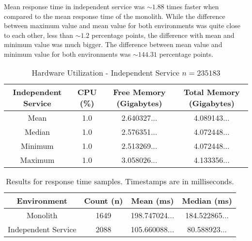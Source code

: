 Mean response time in independent service was $\sim1.88$ times faster when compared to the mean response time of the monolith.
While the difference between maximum value and mean value for both environments was quite close to each other, less than $\sim1.2$ percentage points, the difference with mean and minimum value was much bigger.
The difference between mean value and minimum value for both environments was $\sim144.31$ percentage points.

\begin{table}[h!]
       \begin{tabular}{|c|c|c|c|} 
        \hline
        Independent Service
        & CPU (\%)
        & Free Memory (Gigabytes)
        & Total Memory (Gigabytes) \\ [0.5ex] 
        
        \hline\hline
        Mean
        & 1.0
        & 2.640327...
        & 4.089143... \\ 
        
        Median
        & 1.0
        & 2.576351...
        & 4.072448... \\ 

        Minimum
        & 1.0
        & 2.513269...
        & 4.072448...\\ 
        
        Maximum
        & 1.0
        & 3.058026...
        & 4.133356... \\
        \hline
    \end{tabular}
    \caption{Hardware Utilization - Independent Service $n=235183$}
    \label{table:hardware results:independent service:1}
\end{table}

\begin{table}[h!]
    \begin{tabular}{|c|c|c|c|} 
        \hline
        Environment
        & Count (n)
        & Mean (ms)
        & Median (ms) \\ [0.5ex] 
        
        \hline\hline
        Monolith
        & 1649
        & 198.747024...
        & 184.522865...\\ 
        
        Independent Service
        & 2088
        & 105.660088...
        & 80.588923... \\
        \hline
    \end{tabular}
    \caption{Results for response time samples. Timestamps are in milliseconds.}
    \label{table:response time results:1}
\end{table}


